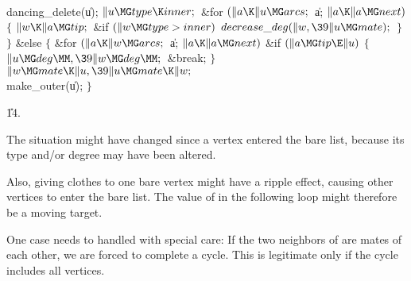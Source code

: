 \\{dancing\_delete}(\|u);\6
${}\|u\MG\\{type}\K\\{inner};{}$\6
\&{for} ${}(\|a\K\|u\MG\\{arcs};{}$ \|a; ${}\|a\K\|a\MG\\{next}){}$\5
${}\{{}$\1\6
${}\|w\K\|a\MG\\{tip};{}$\6
\&{if} ${}(\|w\MG\\{type}>\\{inner}){}$\1\5
${}\\{decrease\_deg}(\|w,\39\|u\MG\\{mate});{}$\2\6
\4${}\}{}$\2\6
\4${}\}{}$\5
\2\&{else}\5
${}\{{}$\1\6
\&{for} ${}(\|a\K\|w\MG\\{arcs};{}$ \|a; ${}\|a\K\|a\MG\\{next}){}$\1\6
\&{if} ${}(\|a\MG\\{tip}\E\|u){}$\5
${}\{{}$\1\6
${}\|u\MG\\{deg}\MM,\39\|w\MG\\{deg}\MM;{}$\6
\&{break};\6
\4${}\}{}$\2\2\6
${}\|w\MG\\{mate}\K\|u,\39\|u\MG\\{mate}\K\|w;{}$\6
\\{make\_outer}(\|u);\6
\4${}\}{}$\2\par
\U14.\fi

The situation might have changed since a vertex entered the bare list,
because its type and/or degree may have been altered.

Also, giving clothes to one bare vertex might have a ripple effect, causing
other vertices to enter the bare list. The value of  in the
following
loop might therefore be a moving target.

One case needs to handled with special care: If the two neighbors of 
are mates of each other, we are forced to complete a cycle. This is
legitimate only if the cycle includes all vertices.

